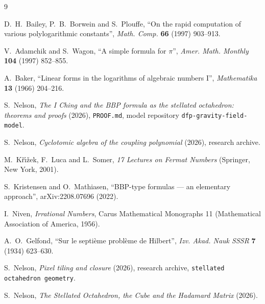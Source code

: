\documentclass[twocolumn]{iopjournal}
\begin{document}
\begin{thebibliography}{9}

D.~H.~Bailey, P.~B.~Borwein and S.~Plouffe,
``On the rapid computation of various polylogarithmic constants'',
\textit{Math. Comp.} \textbf{66} (1997) 903--913.

V.~Adamchik and S.~Wagon,
``A simple formula for $\pi$'',
\textit{Amer. Math. Monthly} \textbf{104} (1997) 852--855.

A.~Baker,
``Linear forms in the logarithms of algebraic numbers I'',
\textit{Mathematika} \textbf{13} (1966) 204--216.

S.~Nelson,
\textit{The I Ching and the BBP formula as the stellated octahedron:
theorems and proofs} (2026), \texttt{PROOF.md}, model repository
\texttt{dfp-gravity-field-model}.

S.~Nelson,
\textit{Cyclotomic algebra of the coupling polynomial} (2026),
research archive.

M.~K\v{r}\'{\i}\v{z}ek, F.~Luca and L.~Somer,
\textit{17 Lectures on Fermat Numbers}
(Springer, New York, 2001).

S.~Kristensen and O.~Mathiasen,
``BBP-type formulas --- an elementary approach'',
arXiv:2208.07696 (2022).

I.~Niven,
\textit{Irrational Numbers}, Carus Mathematical Monographs 11
(Mathematical Association of America, 1956).

A.~O.~Gelfond,
``Sur le septi\`eme probl\`eme de Hilbert'',
\textit{Izv. Akad. Nauk SSSR} \textbf{7} (1934) 623--630.

S.~Nelson,
\textit{Pixel tiling and closure} (2026),
research archive, \texttt{stellated octahedron geometry}.

S.~Nelson,
\textit{The Stellated Octahedron, the Cube and the Hadamard Matrix}
(2026).

\end{thebibliography}
\end{document}
